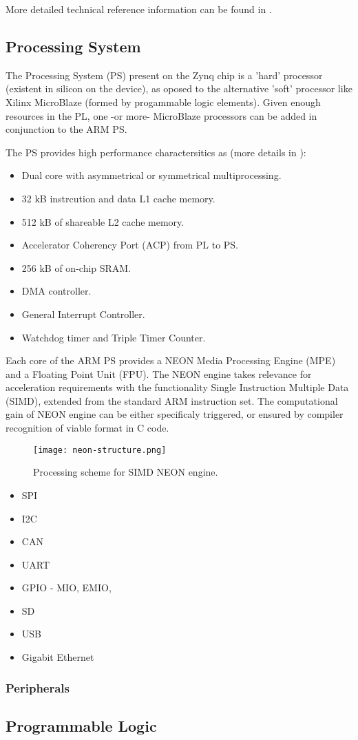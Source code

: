More detailed technical reference information can be found in \cite[p.~30]{UG585}.

\subsection{Processing System}

The Processing System (PS) present on the Zynq chip is a 'hard' processor (existent in silicon on the device), as oposed to the alternative 'soft' processor like Xilinx MicroBlaze (formed by progammable logic elements). Given enough resources in the PL, one -or more- MicroBlaze processors can be added in conjunction to the ARM PS. 

The PS provides high performance charactersitics as (more details in \cite[p.~32]{UG585}):
\begin{itemize}
	\item Dual core with asymmetrical or symmetrical multiprocessing.
	\item 32 kB instrcution and data L1 cache memory.
	\item 512 kB of shareable L2 cache memory.
	\item Accelerator Coherency Port (ACP) from PL to PS.
	\item 256 kB of on-chip SRAM.
	\item DMA controller.
	\item General Interrupt Controller.
	\item Watchdog timer and Triple Timer Counter.
\end{itemize}

Each core of the ARM PS provides a NEON Media Processing Engine (MPE) and a Floating Point Unit (FPU). The NEON engine takes relevance for acceleration requirements with the functionality Single Instruction Multiple Data (SIMD), extended from the standard ARM instruction set. The computational gain of NEON engine can be either specificaly triggered, or ensured by compiler recognition of viable format in C code.

\begin{figure}
	\centering
	\texttt{[image: neon-structure.png]}
	\caption{Processing scheme for SIMD NEON engine.} \label{fig:neon-structure}
\end{figure}

\begin{itemize}
	\item SPI
	\item I2C
	\item CAN 
	\item UART
	\item GPIO - MIO, EMIO, 
	\item SD
	\item USB
	\item Gigabit Ethernet
\end{itemize}

\subsubsection{Peripherals}

\subsection{Programmable Logic}